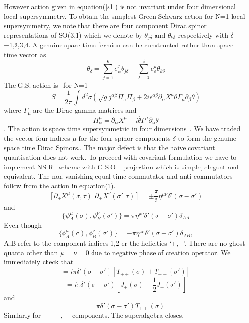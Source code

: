 \documentclass[a4paper,showpacs,preprintnumbers,amsmath,amssymb]{revtex4}
\begin{document}
However action given in equation(\ref{s1}) is not invariant under four
dimensional local supersymmetry. To obtain the simplest Green Schwarz action for N=1
local supersymmetry, we note that there are four component Dirac 
spinor representations of SO(3,1) which we denote by $\theta_{j\delta}$ and $\theta_{k\delta}$
respectively with $\delta$=1,2,3,4. A genuine space time fermion can be constructed rather 
than space time vector as
\begin{equation}
\theta_{\delta}=\sum^6_{j=1}e^j_{\psi}\theta_{j\delta} -
\sum^5_{k=1}e^k_{\phi}\theta_{k\delta}
\end{equation}
The G.S. action is~\cite{gr} for N=1
\begin{equation}
S=\frac{1}{2\pi}\int d^2\sigma \left ( \sqrt{g}g^{\alpha\beta}\Pi_{\alpha}\Pi_{\beta}
+2i\epsilon^{\alpha\beta}\partial_{\alpha}X^{\mu}\bar{\theta}\Gamma_{\mu}
\partial_{\beta}\theta\right )
\end{equation}
where $\Gamma_{\mu}$ are the Dirac gamma matrices and
\[ \Pi^{\mu}_{\alpha}=\partial_{\alpha}X^{\mu}- i\bar{\theta}\Gamma^{\mu}\partial_
{\alpha}\theta\].
The action is space time supersymmetric in four dimensions~\cite{gr}. We have traded the
vector four indices $\mu$ for the four spinor components $\delta$ to form the genuine
space time Dirac Spinors..
The major defect is that the naive covariant quantisation does not work. To proceed with 
covariant formulation we have to implement NS-R~\cite{ne} scheme with G.S.O.~\cite{gl}
projection which is simple, elegant and equivalent.
The non vanishing equal time commutator and anti commutators follow from the action 
in equation(1).
\begin{equation}
\left [\partial_{\pm}X^{\mu}(\sigma ,\tau), \partial_{\pm}X^{\nu}(\sigma' ,\tau)
\right ] = \pm\frac{\pi}{2} \eta^{\mu\nu}\delta'(\sigma-\sigma')
\end{equation}
and
\begin{equation}
\{ \psi_A^{\mu}(\sigma) , \psi_B^{\nu}(\sigma')\} =
\pi \eta^{\mu\nu}\delta'(\sigma-\sigma')\delta_{AB}
\end{equation}
Even though
\begin{equation}
\{ \phi_A^{\mu}(\sigma) , \phi_B^{\nu}(\sigma')\} =-
\pi \eta^{\mu\nu}\delta'(\sigma-\sigma')\delta_{AB},
\end{equation}
A,B refer to the component indices 1,2 or the helicities `+,$-$'.
There are no ghost quanta other than $\mu =\nu =0$ due to negative phase of 
creation operator. We immediately check that
\begin{equation}
[ T_{++}(\sigma),  T_{++}(\sigma') ] =i\pi\delta'(\sigma-\sigma') [T_{++}(\sigma)+
 T_{++}(\sigma') ]
\end{equation}
\begin{equation}
[T_{++}(\sigma),  J_{+}(\sigma')] =
i\pi\delta'(\sigma-\sigma') [ J_{+}(\sigma)+\frac{1}{2} J_{+}(\sigma') ]
\end{equation}
and
\begin{equation}
[J_{+}(\sigma),  J_{+}(\sigma')] =\pi\delta'(\sigma-\sigma')T_{++}(\sigma)
\end{equation}
Similarly for $-~-$ , $-$ components. The superalgebra closes.
\end{document}
